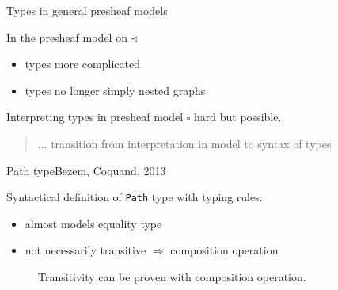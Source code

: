 \documentclass[english]{beamer}
\newcommand{\pa}[3]{\texttt{Path}_{#1}\left(#2, #3\right)}
\begin{document}
\begin{frame}{Types in general presheaf models}

In the presheaf model on $\square$:
\begin{itemize}
    \item types more complicated
    \item types no longer simply nested graphs
\end{itemize}



Interpreting types in presheaf model $\square$ hard but possible.


\begin{quotation}
 ... transition from interpretation in model to syntax of types
\end{quotation}


\end{frame}

\begin{frame}{Path type}{Bezem, Coquand, 2013}
 
 Syntactical definition of \texttt{Path} type with typing rules:

\begin{prooftree}

\end{prooftree}

% 

\begin{itemize}
 \item almost models equality type
 \item not necessarily transitive $\Rightarrow$ composition operation
\end{itemize}


\begin{figure}
\centering

\caption{Transitivity can be proven with composition operation.}
\end{figure}

\end{frame}
\end{document}
